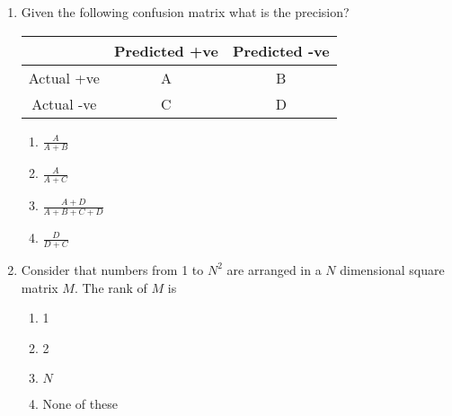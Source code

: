 \documentclass{article}
\begin{document}
\begin{enumerate}
    \item Given the following confusion matrix what is the precision?
    \begin{table}[!htbp]\centering\begin{tabular}{|c|c|c|}
    \hline
               & Predicted +ve & Predicted -ve \\ \hline
    Actual +ve & A             & B             \\ \hline
    Actual -ve & C             & D             \\ \hline
    \end{tabular}\end{table}
    \begin{enumerate}
        \item $\frac{A}{A+B}$
        \item $\frac{A}{A+C}$
        \item $\frac{A+D}{A+B+C+D}$
        \item $\frac{D}{D+C}$
    \end{enumerate}

    \item Consider that numbers from 1 to $N^2$ are arranged in a $N$ dimensional square matrix $M$. The rank of $M$ is
    \begin{enumerate}
        \item 1
        \item 2
        \item $N$
        \item None of these
    \end{enumerate}


\end{enumerate}
\end{document}

